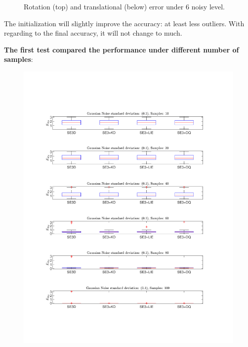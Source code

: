 \begin{figure}
\caption{Rotation (top) and translational (below) error under $6$ noisy level.}
\end{figure}
The initialization will slightly improve the accuracy: at least less outliers. With regarding to the final accuracy, it will not change to much.

\textbf{The first test compared the performance under different number of samples}:
\begin{figure}
\centering
\includegraphics[scale=0.4]{./hand_eye_figures/se3/r_vs_num}

\end{figure}
